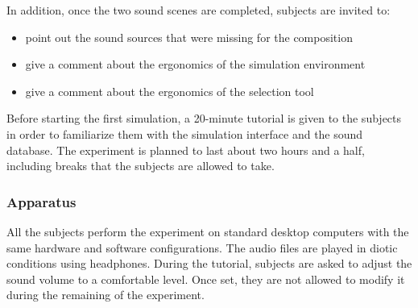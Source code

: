 \documentclass[12pt]{elsarticle}
\begin{document}
%

In addition, once the two sound scenes are completed, subjects are invited to:

\begin{itemize}
\item  point out the sound sources that were missing for the composition
\item  give a comment about the ergonomics of the simulation environment
\item   give a comment about the ergonomics of the selection tool
\end{itemize}


Before starting the first simulation, a 20-minute tutorial is given to the subjects in order to familiarize them with the simulation interface and the sound database. The experiment is planned to last about two hours and a half, including breaks that the subjects are allowed to take.

\subsubsection*{Apparatus}


All the subjects perform the experiment on standard desktop computers with the same hardware and software configurations. The audio files are played in diotic conditions using headphones. During the tutorial, subjects are asked to adjust the sound volume to a comfortable level. Once set, they are not allowed to modify it during the remaining of the experiment.
\end{document}
